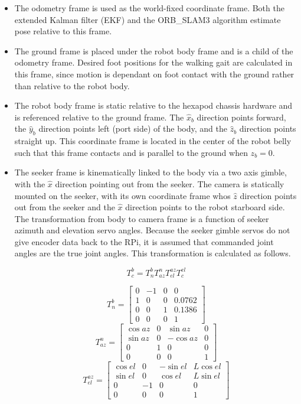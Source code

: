 \begin{itemize}
    \item The odometry frame is used as the world-fixed coordinate frame. Both the extended Kalman filter (EKF) and the ORB\_SLAM3 algorithm estimate pose relative to this frame.

    \item The ground frame is placed under the robot body frame and is a child of the odometry frame. Desired foot positions for the walking gait are calculated in this frame, since motion is dependant on foot contact with the ground rather than relative to the robot body.

    \item The robot body frame is static relative to the hexapod chassis hardware and is referenced relative to the ground frame. The $\hat{x}_b$ direction points forward, the $\hat{y}_b$ direction points left (port side) of the body, and the $\hat{z}_b$ direction points straight up. This coordinate frame is located in the center of the robot belly such that this frame contacts and is parallel to the ground when $z_b = 0$.

    \item The seeker frame is kinematically linked to the body via a two axis gimble, with the $\hat{x}$ direction pointing out from the seeker. The camera is statically mounted on the seeker, with its own coordinate frame whos $\hat{z}$ direction points out from the seeker and the $\hat{x}$ direction points to the robot starboard side. The transformation from body to camera frame is a function of seeker azimuth and elevation servo angles. Because the seeker gimble servos do not give encoder data back to the RPi, it is assumed that commanded joint angles are the true joint angles. This transformation is calculated as follows.

    \[
    T^b_c = T^b_n T^n_{az} T^{az}_{el} T^{el}_{c}
    \]

    \[
    T^b_n = \begin{bmatrix} 0 & -1 & 0 & 0 \\
                            1 & 0 & 0 & 0.0762 \\
                            0 & 0 & 1 & 0.1386 \\
                            0 & 0 & 0 & 1 \end{bmatrix}
    \]
    \[
    T^n_{az} = \begin{bmatrix} \cos{az} & 0 & \sin{az} & 0 \\
                               \sin{az} & 0 & -\cos{az} & 0 \\
                               0 & 1 & 0 & 0 \\
                               0 & 0 & 0 & 1 \end{bmatrix}
    \]
    \[
    T^{az}_{el} = \begin{bmatrix} \cos{el} & 0 & -\sin{el} & L \cos{el} \\
                                  \sin{el} & 0 & \cos{el} & L \sin{el} \\
                                  0 & -1 & 0 & 0 \\
                                  0 & 0 & 0 & 1\end{bmatrix}
    \]


\end{itemize}
